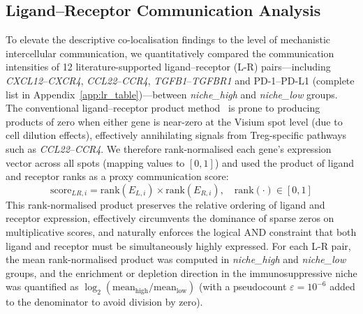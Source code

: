 \documentclass[12pt, a4paper]{article}
\begin{document}
\subsection{Ligand--Receptor Communication Analysis}

To elevate the descriptive co-localisation findings to the level of mechanistic intercellular communication, we quantitatively compared the communication intensities of 12 literature-supported ligand--receptor (L-R) pairs---including \textit{CXCL12}--\textit{CXCR4}, \textit{CCL22}--\textit{CCR4}, \textit{TGFB1}--\textit{TGFBR1} and PD-1--PD-L1 (complete list in Appendix~\ref{app:lr_table})---between \textit{niche\_high} and \textit{niche\_low} groups. The conventional ligand--receptor product method~\citep{efremova2020cellphonedb} is prone to producing products of zero when either gene is near-zero at the Visium spot level (due to cell dilution effects), effectively annihilating signals from Treg-specific pathways such as \textit{CCL22}--\textit{CCR4}. We therefore rank-normalised each gene's expression vector across all spots (mapping values to $[0,1]$) and used the product of ligand and receptor ranks as a proxy communication score:
\begin{equation*}
\text{score}_{LR,i} = \text{rank}(E_{L,i}) \times \text{rank}(E_{R,i}), \quad \text{rank}(\cdot) \in [0,1]
\end{equation*}
This rank-normalised product preserves the relative ordering of ligand and receptor expression, effectively circumvents the dominance of sparse zeros on multiplicative scores, and naturally enforces the logical AND constraint that both ligand and receptor must be simultaneously highly expressed. For each L-R pair, the mean rank-normalised product was computed in \textit{niche\_high} and \textit{niche\_low} groups, and the enrichment or depletion direction in the immunosuppressive niche was quantified as $\log_2(\text{mean}_{\text{high}}/\text{mean}_{\text{low}})$ (with a pseudocount $\varepsilon = 10^{-6}$ added to the denominator to avoid division by zero).
\end{document}
